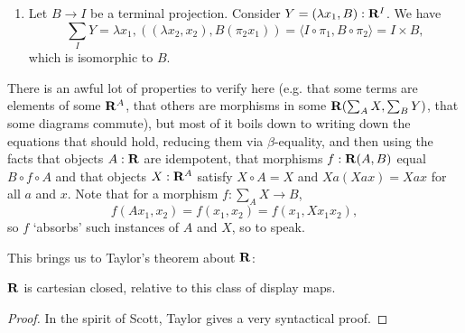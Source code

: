 \begin{enumerate}
  \item Let $ B \to I $ be a terminal projection. Consider $ Y = (\lambda x_1, B) : \mathbf{R}^I $. We have
    \[ \sum_I Y = \lambda x_1, ((\lambda x_2, x_2), B (\pi_2 x_1)) = \langle I \circ \pi_1, B \circ \pi_2 \rangle = I \times B, \]
    which is isomorphic to $ B $.
\end{enumerate}
\begin{remark}
  There is an awful lot of properties to verify here (e.g. that some terms are elements of some $ \mathbf{R}^A $, that others are morphisms in some $ \mathbf{R}(\sum_A X, \sum_B Y) $, that some diagrams commute), but most of it boils down to writing down the equations that should hold, reducing them via $ \beta $-equality, and then using the facts that objects $ A: \mathbf{R} $ are idempotent, that morphisms $ f: \mathbf{R}(A, B) $ equal $ B \circ f \circ A $ and that objects $ X: \mathbf{R}^A $ satisfy $ X \circ A = X $ and $ X a (X a x) = X a x $ for all $ a $ and $ x $. Note that for a morphism $ f: \sum_A X \to B $,
  \[ f(A x_1, x_2) = f(x_1, x_2) = f(x_1, X x_1 x_2), \]
  so $ f $ `absorbs' such instances of $ A $ and $ X $, so to speak.
\end{remark}

This brings us to Taylor's theorem about $ \mathbf{R} $:
\begin{theorem}
  $ \mathbf{R} $ is cartesian closed, relative to this class of display maps.
\end{theorem}
\begin{proof}
  In the spirit of Scott, Taylor gives a very syntactical proof.
\end{proof}
